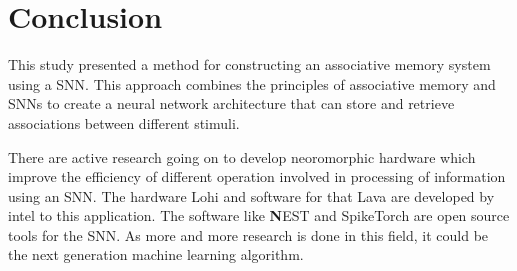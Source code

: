 \chapter{Conclusion}%

This study presented a method for constructing an associative memory system
using a SNN. This approach combines the principles of associative memory and
SNNs to create a neural network architecture that can store and retrieve
associations between different stimuli.

There are active research going on to develop neoromorphic hardware which
improve the efficiency of different operation involved in processing of
information using an SNN. The hardware Lohi and software for that Lava are
developed by intel to this application. The software like \textbf NEST and
SpikeTorch are open source tools for the SNN. As more and more research is done
in this field, it could be the next generation machine learning algorithm.
